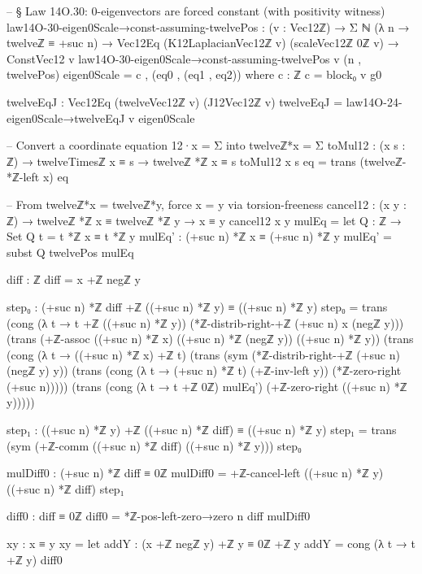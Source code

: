 \documentclass[11pt,a4paper]{book}
\begin{document}
\begin{code}
-- § Law 14O.30: 0-eigenvectors are forced constant (with positivity witness)
law14O-30-eigen0Scale→const-assuming-twelvePos : (v : Vec12ℤ) →
  Σ ℕ (λ n → twelveℤ ≡ +suc n) →
  Vec12Eq (K12LaplacianVec12ℤ v) (scaleVec12ℤ 0ℤ v) →
  ConstVec12 v
law14O-30-eigen0Scale→const-assuming-twelvePos v (n , twelvePos) eigen0Scale =
  c , (eq0 , (eq1 , eq2))
  where
    c : ℤ
    c = block₀ v g0

    twelveEqJ : Vec12Eq (twelveVec12ℤ v) (J12Vec12ℤ v)
    twelveEqJ = law14O-24-eigen0Scale→twelveEqJ v eigen0Scale

    -- Convert a coordinate equation 12·x = Σ into twelveℤ*x = Σ
    toMul12 : (x s : ℤ) → twelveTimesℤ x ≡ s → twelveℤ *ℤ x ≡ s
    toMul12 x s eq = trans (twelveℤ-*ℤ-left x) eq

    -- From twelveℤ*x = twelveℤ*y, force x = y via torsion-freeness
    cancel12 : (x y : ℤ) → twelveℤ *ℤ x ≡ twelveℤ *ℤ y → x ≡ y
    cancel12 x y mulEq =
      let
        Q : ℤ → Set
        Q t = t *ℤ x ≡ t *ℤ y
        mulEq' : (+suc n) *ℤ x ≡ (+suc n) *ℤ y
        mulEq' = subst Q twelvePos mulEq

        diff : ℤ
        diff = x +ℤ negℤ y

        step₀ : (+suc n) *ℤ diff +ℤ ((+suc n) *ℤ y) ≡ ((+suc n) *ℤ y)
        step₀ =
          trans
            (cong (λ t → t +ℤ ((+suc n) *ℤ y)) (*ℤ-distrib-right-+ℤ (+suc n) x (negℤ y)))
            (trans
              (+ℤ-assoc ((+suc n) *ℤ x) ((+suc n) *ℤ (negℤ y)) ((+suc n) *ℤ y))
              (trans
                (cong (λ t → ((+suc n) *ℤ x) +ℤ t)
                      (trans
                        (sym (*ℤ-distrib-right-+ℤ (+suc n) (negℤ y) y))
                        (trans
                          (cong (λ t → (+suc n) *ℤ t) (+ℤ-inv-left y))
                          (*ℤ-zero-right (+suc n)))))
                (trans
                  (cong (λ t → t +ℤ 0ℤ) mulEq')
                  (+ℤ-zero-right ((+suc n) *ℤ y)))))

        step₁ : ((+suc n) *ℤ y) +ℤ ((+suc n) *ℤ diff) ≡ ((+suc n) *ℤ y)
        step₁ =
          trans
            (sym (+ℤ-comm ((+suc n) *ℤ diff) ((+suc n) *ℤ y)))
            step₀

        mulDiff0 : (+suc n) *ℤ diff ≡ 0ℤ
        mulDiff0 = +ℤ-cancel-left ((+suc n) *ℤ y) ((+suc n) *ℤ diff) step₁

        diff0 : diff ≡ 0ℤ
        diff0 = *ℤ-pos-left-zero→zero n diff mulDiff0

        xy : x ≡ y
        xy =
          let
            addY : (x +ℤ negℤ y) +ℤ y ≡ 0ℤ +ℤ y
            addY = cong (λ t → t +ℤ y) diff0


\end{code}
\end{document}
